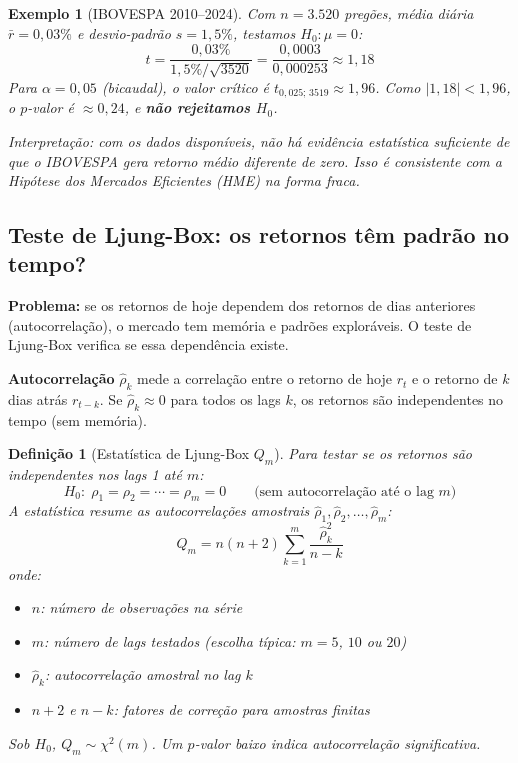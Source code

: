 \documentclass[11pt,a4paper]{article}
\theoremstyle{quant}
\newtheorem{definicao}{Definição}[section]
\newtheorem{exemplo}{Exemplo}[section]
\begin{document}
\begin{exemplo}[IBOVESPA 2010--2024]
Com $n = 3.520$ pregões, média diária $\bar{r} = 0{,}03\%$ e desvio-padrão
$s = 1{,}5\%$, testamos $H_0: \mu = 0$:
\[
  t = \frac{0{,}03\%}{1{,}5\% \big/ \sqrt{3520}} = \frac{0{,}0003}{0{,}000253} \approx 1{,}18
\]
Para $\alpha = 0{,}05$ (bicaudal), o valor crítico é $t_{0{,}025;\,3519} \approx 1{,}96$.
Como $|1{,}18| < 1{,}96$, o $p$-valor é $\approx 0{,}24$, e \textbf{não rejeitamos $H_0$}.

Interpretação: com os dados disponíveis, não há evidência estatística suficiente
de que o IBOVESPA gera retorno médio diferente de zero. Isso é consistente com a
Hipótese dos Mercados Eficientes (HME) na forma fraca.
\end{exemplo}

\subsection{Teste de Ljung-Box: os retornos têm padrão no tempo?}

\textbf{Problema:} se os retornos de hoje dependem dos retornos de dias anteriores
(autocorrelação), o mercado tem memória e padrões exploráveis. O teste de Ljung-Box
verifica se essa dependência existe.

\textbf{Autocorrelação} $\hat\rho_k$ mede a correlação entre o retorno de hoje $r_t$
e o retorno de $k$ dias atrás $r_{t-k}$. Se $\hat\rho_k \approx 0$ para todos os lags
$k$, os retornos são independentes no tempo (sem memória).

\begin{definicao}[Estatística de Ljung-Box $Q_m$]
Para testar se os retornos são independentes nos lags 1 até $m$:
\[
  H_0:\; \rho_1 = \rho_2 = \cdots = \rho_m = 0
  \qquad \text{(sem autocorrelação até o lag $m$)}
\]
A estatística resume as autocorrelações amostrais $\hat\rho_1, \hat\rho_2, \ldots, \hat\rho_m$:
\[
  Q_m = n(n+2)\sum_{k=1}^{m}\frac{\hat\rho_k^2}{n - k}
\]
onde:
\begin{itemize}
  \item $n$: número de observações na série
  \item $m$: número de lags testados (escolha típica: $m = 5$, $10$ ou $20$)
  \item $\hat\rho_k$: autocorrelação amostral no lag $k$
  \item $n+2$ e $n-k$: fatores de correção para amostras finitas
\end{itemize}
Sob $H_0$, $Q_m \sim \chi^2(m)$. Um $p$-valor baixo indica autocorrelação significativa.
\end{definicao}
\end{document}

